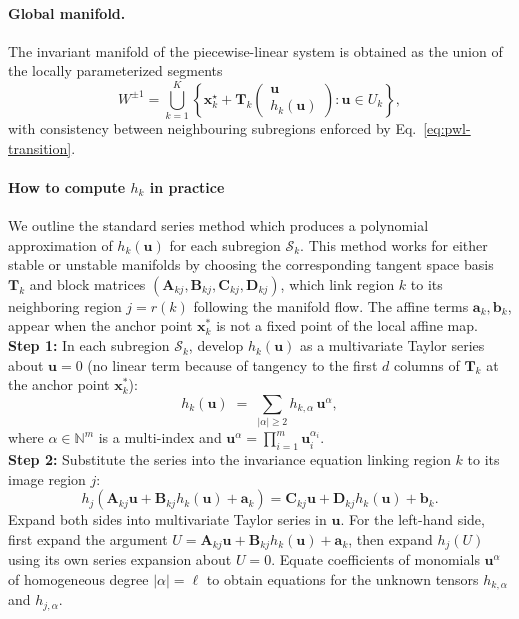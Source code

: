 \documentclass{article}
\theoremstyle{example}
\theoremstyle{plain}
\theoremstyle{definition}
\theoremstyle{remark}
\def\eqref#1{equation~\ref{#1}}
\def\vx{{\bm{x}}}
\def\mA{{\bm{A}}}
\def\mB{{\bm{B}}}
\def\mC{{\bm{C}}}
\def\mD{{\bm{D}}}
\def\mT{{\bm{T}}}
\renewcommand{\eqref}[1]{Eq.~\ref{#1}}
\begin{document}
\paragraph{Global manifold.} 
The invariant manifold of the piecewise-linear system is obtained as the
union of the locally parameterized segments 
\begin{equation}
W^{\pm1}
=
\bigcup_{k=1}^K
\left\{
\vx_k^\star + \mT_k
\begin{pmatrix}
\bm{u} \\ h_k(\bm{u})
\end{pmatrix}
:
\bm{u}\in U_k
\right\},
\end{equation}
with consistency between neighbouring subregions enforced by \eqref{eq:pwl-transition}.

\paragraph{How to compute $h_k$ in practice}
We outline the standard series method which produces a polynomial approximation of $h_k(\bm{u})$ for each subregion $\mathcal{S}_k$. This method works for either stable or unstable manifolds by choosing the corresponding tangent space basis $\mT_k$ and block matrices $(\mA_{kj}, \mB_{kj}, \mC_{kj}, \mD_{kj})$, which link region $k$ to its neighboring region $j = r(k)$ following the manifold flow. The affine terms $\bm{a}_k, \bm{b}_k$, appear when the anchor point $\vx_k^*$ is not a fixed point of the local affine map.\\

%
\textbf{Step 1:} In each subregion $\mathcal{S}_k$, develop $h_k(\bm{u})$ as a multivariate Taylor series about $\bm{u}=0$ (no linear term because of tangency to the first $d$ columns of $\mT_k$ at the anchor point $\vx_k^*$): 
%
\begin{equation}
h_k(\bm{u}) \;=\; \sum_{|\alpha|\ge 2} h_{k,\alpha}\, \bm{u}^\alpha,
\end{equation}
where $\alpha\in\mathbb{N}^m$ is a multi-index and $\bm{u}^\alpha=\prod_{i=1}^m \bm{u}_i^{\alpha_i}$.\\

\textbf{Step 2:} Substitute the series into the invariance equation linking region $k$ to its image region $j$:
\begin{equation}
h_j\!\left(\mA_{kj} \bm{u} + \mB_{kj} h_k(\bm{u}) + \bm{a}_k\right)
=
\mC_{kj} \bm{u} + \mD_{kj} h_k(\bm{u}) + \bm{b}_k .
\label{}
\end{equation}
Expand both sides into multivariate Taylor series in $\bm{u}$. For the left-hand side, first expand the argument $U = \mA_{kj} \bm{u} + \mB_{kj} h_k(\bm{u}) + \bm{a}_k$, then expand $h_j(U)$ using its own series expansion about $U=0$. Equate coefficients of monomials $\bm{u}^\alpha$ of homogeneous degree $|\alpha| = \ell$ to obtain equations for the unknown tensors $h_{k,\alpha}$ and $h_{j,\alpha}$.\\
\end{document}
